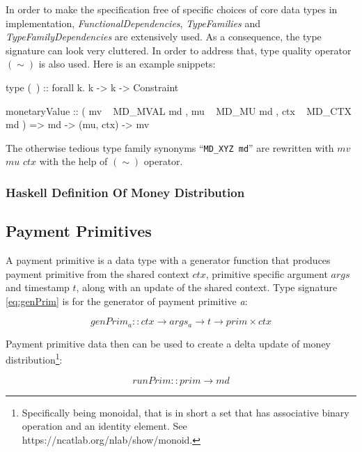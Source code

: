 In order to make the specification free of specific choices of core data types in
implementation, \textit{FunctionalDependencies}, \textit{TypeFamilies}
and \textit{TypeFamilyDependencies} are extensively used. As a consequence, the type signature can
look very cluttered. In order to address that, type quality operator $(\sim)$ is also used. Here is
an example snippets:

\begin{code}
    type (~) :: forall k. k -> k -> Constraint

    monetaryValue :: ( mv  ~ MD_MVAL md
                     , mu  ~ MD_MU md
                     , ctx ~ MD_CTX md
                     )
                  => md -> (mu, ctx) -> mv
\end{code}

The otherwise tedious type family synonyms ``\texttt{MD_XYZ md}'' are rewritten with $mv$
$mu$ $ctx$ with the help of $(\sim)$ operator.

\subsubsection{Haskell Definition Of Money Distribution}



\subsection{Payment Primitives}

A payment primitive is a data type with a generator function that produces payment primitive from
the shared context $ctx$, primitive specific argument $args$ and timestamp $t$, along with an update
of the shared context. Type signature \ref{eq:genPrim} is for the generator of payment
primitive \textit{a}:

\begin{equation}\label{eq:genPrim}
    genPrim_a :: ctx \rightarrow args_a \rightarrow t \rightarrow prim \times ctx
\end{equation}

Payment primitive data then can be used to create a delta update of money
distribution\footnote{Specifically being monoidal, that is in short a set that has associative
binary operation and an identity element. See https://ncatlab.org/nlab/show/monoid.}:

\begin{equation}
    runPrim :: prim \rightarrow md
\end{equation}

